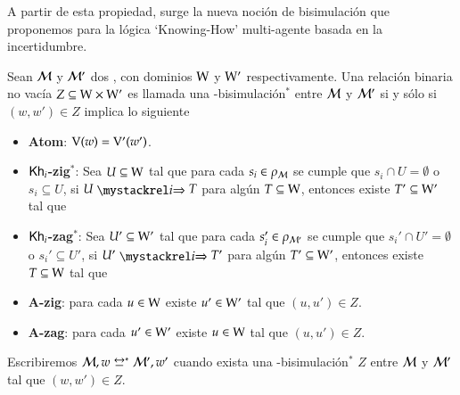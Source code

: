A partir de esta propiedad, surge la nueva noción de bisimulación que proponemos para la lógica `Knowing-How' multi-agente basada en la 
incertidumbre.

\begin{definicion}\label{def:bisim_redefinition}
    Sean $\mathcal{M}$ y $\mathcal{M}'$ dos \ultss, con dominios $\mathrm{W}$ y $\mathrm{W}'$ respectivamente.
    Una relación binaria no vacía $Z \subseteq \mathrm{W} \times \mathrm{W}'$ es llamada una \KHilogic-bisimulación$^*$ entre $\mathcal{M}$ y 
    $\mathcal{M}'$ si y sólo si $(w,w') \in Z$ implica lo siguiente
    \begin{itemize}
        \item \textbf{Atom}: $\mathrm{V}(w)=\mathrm{V}'(w')$.

        \item \textbf{$\mathsf{Kh}_i$-zig$^*$}: Sea $U \subseteq \mathrm{W}$ tal que para cada $s_i \in \rho_{\mathcal{M}}$ se cumple que $s_i \cap U = \emptyset$ o $s_i \subseteq U$, si $U \ultsExecAgi T$ para algún $T \subseteq \mathrm{W}$, entonces existe $T' \subseteq \mathrm{W}'$ tal que
        \begin{multicols}{2}
        \end{multicols}
        
        \item \textbf{$\mathsf{Kh}_i$-zag$^*$}: Sea $U' \subseteq \mathrm{W}'$ tal que para cada $s_i' \in \rho_{\mathcal{M}'}$ se cumple que $s_i' \cap U' = \emptyset$ o $s_i' \subseteq U'$, si $U' \ultsExecAgi T'$ para algún $T' \subseteq \mathrm{W}'$, entonces existe $T \subseteq \mathrm{W}$ tal que
        \begin{multicols}{2}
        \end{multicols}

        \item \textbf{A-zig}: para cada $u \in \mathrm{W}$ existe $u' \in \mathrm{W}'$ tal que $(u,u') \in Z$.

        \item \textbf{A-zag}: para cada $u' \in \mathrm{W}'$ existe $u \in \mathrm{W}$ tal que $(u,u') \in Z$.
    \end{itemize} 

    Escribiremos $\modults,w \bisim^* \modults',w'$ cuando exista una \KHilogic-bisimulación$^*$ $Z$ entre
    $\mathcal{M}$ y $\mathcal{M}'$ tal que $(w,w') \in Z$.
\end{definicion}

